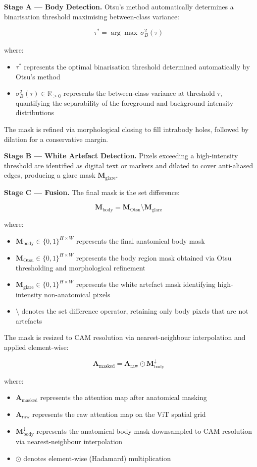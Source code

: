 \textbf{Stage A --- Body Detection.} Otsu's method automatically determines a binarisation threshold maximising between-class variance:

$$
\tau^{*} = \arg\max_{\tau} \, \sigma^2_B(\tau)
$$

where:
\begin{itemize}
\item $\tau^{*}$ represents the optimal binarisation threshold determined automatically by Otsu's method
\item $\sigma^2_B(\tau) \in \mathbb{R}_{\geq 0}$ represents the between-class variance at threshold $\tau$, quantifying the separability of the foreground and background intensity distributions
\end{itemize}

The mask is refined via morphological closing to fill intrabody holes, followed by dilation for a conservative margin.

\textbf{Stage B --- White Artefact Detection.} Pixels exceeding a high-intensity threshold are identified as digital text or markers and dilated to cover anti-aliased edges, producing a glare mask $\mathbf{M}_{\text{glare}}$.

\textbf{Stage C --- Fusion.} The final mask is the set difference:

$$
\mathbf{M}_{\text{body}} = \mathbf{M}_{\text{Otsu}} \setminus \mathbf{M}_{\text{glare}}
$$

where:
\begin{itemize}
\item $\mathbf{M}_{\text{body}} \in \{0,1\}^{H \times W}$ represents the final anatomical body mask
\item $\mathbf{M}_{\text{Otsu}} \in \{0,1\}^{H \times W}$ represents the body region mask obtained via Otsu thresholding and morphological refinement
\item $\mathbf{M}_{\text{glare}} \in \{0,1\}^{H \times W}$ represents the white artefact mask identifying high-intensity non-anatomical pixels
\item $\setminus$ denotes the set difference operator, retaining only body pixels that are not artefacts
\end{itemize}

The mask is resized to CAM resolution via nearest-neighbour interpolation and applied element-wise:

$$
\mathbf{A}_{\text{masked}} = \mathbf{A}_{\text{raw}} \odot \mathbf{M}_{\text{body}}^{\downarrow}
$$

where:
\begin{itemize}
\item $\mathbf{A}_{\text{masked}}$ represents the attention map after anatomical masking
\item $\mathbf{A}_{\text{raw}}$ represents the raw attention map on the ViT spatial grid
\item $\mathbf{M}_{\text{body}}^{\downarrow}$ represents the anatomical body mask downsampled to CAM resolution via nearest-neighbour interpolation
\item $\odot$ denotes element-wise (Hadamard) multiplication
\end{itemize}

